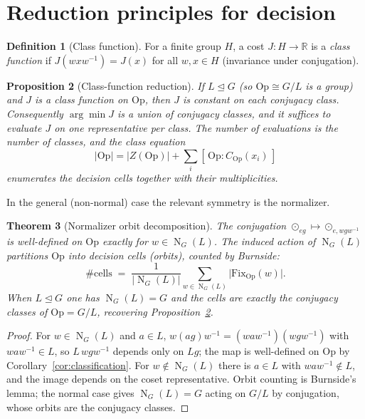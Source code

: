 \documentclass[11pt,a4paper]{article}
\newcommand{\Op}{\mathrm{Op}}
\newcommand{\R}{\mathbb{R}}
\newcommand{\Fix}{\mathrm{Fix}}
\DeclareMathOperator{\Norm}{N}
\theoremstyle{plain}
\newtheorem{theorem}{Theorem}
\newtheorem{proposition}[theorem]{Proposition}
\theoremstyle{definition}
\newtheorem{definition}[theorem]{Definition}
\theoremstyle{remark}
\begin{document}
\section{Reduction principles for decision}

\begin{definition}[Class function]
For a finite group $H$, a cost $J:H\to\R$ is a \emph{class function} if
$J(w x w^{-1}) = J(x)$ for all $w,x\in H$ (invariance under conjugation).
\end{definition}

\begin{proposition}[Class-function reduction]\label{prop:classfn}
If $L\trianglelefteq G$ (so $\Op\cong G/L$ is a group) and $J$ is a class
function on $\Op$, then $J$ is constant on each conjugacy class. Consequently
$\arg\min J$ is a union of conjugacy classes, and it suffices to evaluate $J$ on
one representative per class. The number of evaluations is the number of classes,
and the \emph{class equation}
\[
|\Op| = |Z(\Op)| + \sum_i [\,\Op : C_{\Op}(x_i)\,]
\]
enumerates the decision cells together with their multiplicities.
\end{proposition}

In the general (non-normal) case the relevant symmetry is the normalizer.

\begin{theorem}[Normalizer orbit decomposition]\label{thm:orbits}
The conjugation $\odot_{eg}\mapsto \odot_{e,wgw^{-1}}$ is well-defined on $\Op$
exactly for $w\in \Norm_G(L)$. The induced action of $\Norm_G(L)$ partitions
$\Op$ into \emph{decision cells} (orbits), counted by Burnside:
\[
\#\text{cells} \;=\; \frac{1}{|\Norm_G(L)|}\sum_{w\in \Norm_G(L)}
\bigl|\Fix_{\Op}(w)\bigr|.
\]
When $L\trianglelefteq G$ one has $\Norm_G(L)=G$ and the cells are exactly the
conjugacy classes of $\Op=G/L$, recovering Proposition~\ref{prop:classfn}.
\end{theorem}

\begin{proof}
For $w\in\Norm_G(L)$ and $a\in L$, $w(ag)w^{-1} = (waw^{-1})(wgw^{-1})$ with
$waw^{-1}\in L$, so $L\,w g w^{-1}$ depends only on $Lg$; the map is well-defined
on $\Op$ by Corollary~\ref{cor:classification}. For $w\notin\Norm_G(L)$ there is
$a\in L$ with $waw^{-1}\notin L$, and the image depends on the coset
representative. Orbit counting is Burnside's lemma; the normal case gives
$\Norm_G(L)=G$ acting on $G/L$ by conjugation, whose orbits are the conjugacy
classes.
\end{proof}
\end{document}
